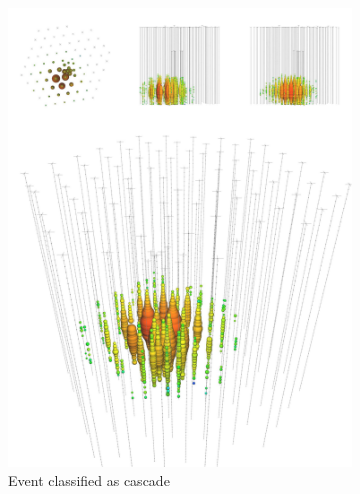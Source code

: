 \documentclass{thesis}
\begin{document}
\begin{figure}\label{fig:events}
    \begin{center}
        \begin{subfigure}{0.4\textwidth}
            \centering
            \includegraphics[clip, trim=0cm 0cm 0cm 30cm, width=1\textwidth]{figures/cascade_event.pdf}
            \caption{Event classified as cascade}  
            \label{fig:events_cascade}
          \end{subfigure}
        \begin{subfigure}{0.4\textwidth}
            \centering

\end{subfigure}
\end{center}
\end{figure}
\end{document}
